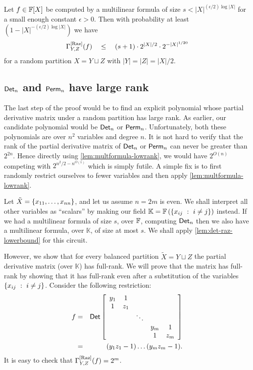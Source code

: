 \begin{lemma}\label{lem:multformula-lowrank}
  Let $f \in \mathbb{F}[X]$ be computed by a multilinear formula of size $s < |X|^{(\epsilon/2) \log |X|}$ for a small enough constant $\epsilon > 0$. 
Then with probability at least $(1 - |X|^{-(\epsilon/2)\log |X|})$ we have $$\Gamma^{\mathrm{[Raz]}}_{Y,Z}(f) \quad \leq \quad (s+1)\cdot 2^{|X|/2} \cdot 2^{-|X|^{1/20}}$$ for a random partition $X = Y \sqcup Z$ with $|Y| = |Z| = |X|/2$.
\end{lemma}

\subsection{$\operatorname{\mathsf{Det}}_n$ and $\operatorname{\mathsf{Perm}}_n$ have large rank}

The last step of the proof would be to find an explicit polynomial whose partial derivative matrix under a random partition has large rank. 
As earlier, our candidate polynomial would be $\operatorname{\mathsf{Det}}_n$ or $\operatorname{\mathsf{Perm}}_n$. 
Unfortunately, both these polynomials are over $n^2$ variables and degree $n$. 
It is not hard to verify that the rank of the partial derivative matrix of $\operatorname{\mathsf{Det}}_n$ or $\operatorname{\mathsf{Perm}}_n$ can never be greater than $2^{2n}$. 
Hence directly using \autoref{lem:multformula-lowrank}, we would have $2^{O(n)}$ competing with $2^{n^2/2 - n^{O(1)}}$ which is simply futile. 
A simple fix is to first randomly restrict ourselves to fewer variables and then apply \autoref{lem:multformula-lowrank}. 

Let $\tilde{X} = \left\{x_{11},\ldots, x_{nn}\right\}$, and let us assume $n = 2m$ is even. We shall interpret all other variables as ``scalars'' by making our field $\mathbb{K} = \mathbb{F}\left(\left\{{x_{ij}}\ : \ {i\neq j}\right\}\right)$ instead. If we had a multilinear formula of size $s$, over $\mathbb{F}$, computing $\operatorname{\mathsf{Det}}_n$ then we also have a multilinear formula, over $\mathbb{K}$, of size at most $s$. We shall apply \autoref{lem:det-raz-lowerbound} for this circuit.

However, we show that for every balanced partition $\tilde{X} = Y \sqcup Z$ the partial derivative matrix (over $\mathbb{K}$) has full-rank. We will prove that the matrix has full-rank by showing that it has full-rank even after a substitution of the variables $\left\{{x_{ij}}\ : \ {i\neq j}\right\}$. Consider the following restriction:
\begin{eqnarray*}
f & = & \operatorname{\mathsf{Det}} \left[ \begin{array}{ccccc}
y_1 & 1   &        &     &    \\
1   & z_1 &        &     &    \\
    &     & \ddots &     &    \\
    &     &        & y_m &1   \\
    &     &        & 1   &z_m 
  \end{array}\right]\\
 &= & (y_1z_1 - 1)\dots (y_mz_m - 1).
\end{eqnarray*}
It is easy to check that $\Gamma^{\mathrm{[Raz]}}_{Y,Z}(f) = 2^m$. 

